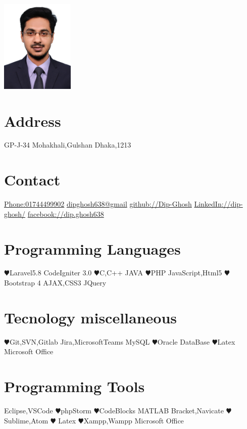 \documentclass[]{cv-style}
\begin{document}
\begin{aside}
\section{} 
\includegraphics[width=3.5cm]{Dip.jpg}
\section{Address}
    GP-J-34
    Mohakhali,Gulshan
    Dhaka,1213
\section{Contact}
\href{Phone:+8801744499902}{Phone:01744499902}
\href{mail:dipghosh638@gmail.com}{dipghosh638@gmail}
\href{Github:https://github.com/Dip-Ghosh}{github://Dip-Ghosh}
\href{LinkedIn:https://www.linkedin.com/in/dip-ghosh-54b5aba3/}{LinkedIn://dip-ghosh/}
\href{https://www.facebook.com/dip.ghosh638}{facebook://dip.ghosh638}
\section{Programming
   Languages}
{\color{red} $\varheartsuit$}Laravel5.8
CodeIgniter 3.0
 {\color{red} $\varheartsuit$}C,C++
 JAVA
{\color{red} $\varheartsuit$}PHP
JavaScript,Html5
 {\color{red} $\varheartsuit$}Bootstrap 4
AJAX,CSS3
JQuery
~
\section{Tecnology miscellaneous }
 {\color{red} $\varheartsuit$}Git,SVN,Gitlab
 Jira,MicrosoftTeams
 MySQL
 {\color{red} $\varheartsuit$}Oracle DataBase
  {\color{red} $\varheartsuit$}Latex
 Microsoft Office
\section{Programming Tools}
    Eclipse,VSCode
    {\color{red} $\varheartsuit$}phpStorm
    {\color{red} $\varheartsuit$}CodeBlocks
   MATLAB Bracket,Navicate
   {\color{red} $\varheartsuit$}Sublime,Atom
   {\color{red} $\varheartsuit$} Latex
    {\color{red} $\varheartsuit$}Xampp,Wampp
    Microsoft Office
\end{aside}
\end{document}
